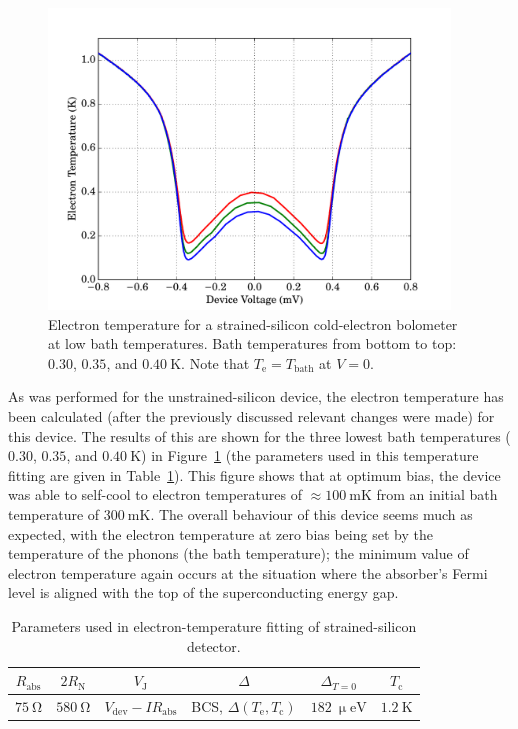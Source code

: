 \par
\begin{figure}[tb]
\begin{center}
\includegraphics[width = 0.95\textwidth]{figures/strained_Te}
\caption[Electron temperature for a strained-silicon cold-electron bolometer]{Electron temperature for a strained-silicon cold-electron bolometer at low bath temperatures. Bath temperatures from bottom to top: $0.30$, $0.35$, and $0.40~\mathrm{K}$. Note that $T_{\mathrm{e}} = T_{\mathrm{bath}}$ at $V = 0$.}
\label{fig:strainedTe}
\end{center}
\end{figure}
As was performed for the unstrained-silicon device, the electron temperature has been calculated (after the previously discussed relevant changes were made) for this device. The results of this are shown for the three lowest bath temperatures ($0.30$, $0.35$, and $0.40~\mathrm{K}$) in Figure~\ref{fig:strainedTe} (the parameters used in this temperature fitting are given in Table~\ref{tab:strainedTeParams_dark}). This figure shows that at optimum bias, the device was able to self-cool to electron temperatures of $\approx 100~\mathrm{mK}$ from an initial bath temperature of $300~\mathrm{mK}$. The overall behaviour of this device seems much as expected, with the electron temperature at zero bias being set by the temperature of the phonons (the bath temperature); the minimum value of electron temperature again occurs at the situation where the absorber's Fermi level is aligned with the top of the superconducting energy gap.
\begin{table}[htb]
\caption[Parameters used in electron-temperature fitting of strained-silicon detector with optical loading]{Parameters used in electron-temperature fitting of strained-silicon detector.} 
\label{tab:strainedTeParams_dark}
\centering
\begin{tabular}{cccccc}
\toprule\toprule
$R_{\mathrm{abs}}$ & $2R_{\mathrm{N}}$ & $V_{\mathrm{J}}$ & $\varDelta$ & $\varDelta_{T=0}$ & $T_{\mathrm{c}}$ \\ \midrule
$75~\mathrm{\Omega}$ & $580~\mathrm{\Omega}$ & $V_{\mathrm{dev}} - IR_{\mathrm{abs}}$ 
& BCS, $\varDelta\left(T_{\mathrm{e}},T_{\mathrm{c}}\right)$ & $182~\mathrm{\upmu eV}$ & $1.2~\mathrm{K}$ \\
\bottomrule
\end{tabular}
\end{table}
%
